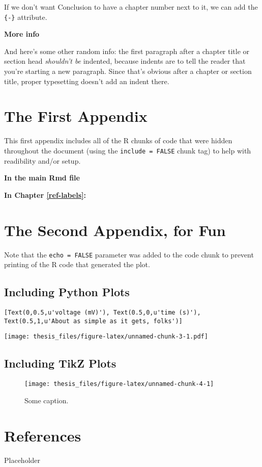 \documentclass[12pt,twoside]{reedthesis}
\begin{document}
If we don't want Conclusion to have a chapter number next to it, we can add the \texttt{\{-\}} attribute.

\textbf{More info}

And here's some other random info: the first paragraph after a chapter title or section head \emph{shouldn't be} indented, because indents are to tell the reader that you're starting a new paragraph. Since that's obvious after a chapter or section title, proper typesetting doesn't add an indent there.

\appendix

\hypertarget{the-first-appendix}{%
\chapter{The First Appendix}\label{the-first-appendix}}

This first appendix includes all of the R chunks of code that were hidden throughout the document (using the \texttt{include\ =\ FALSE} chunk tag) to help with readibility and/or setup.

\textbf{In the main Rmd file}

\textbf{In Chapter \ref{ref-labels}:}

\hypertarget{the-second-appendix-for-fun}{%
\chapter{The Second Appendix, for Fun}\label{the-second-appendix-for-fun}}

Note that the \texttt{echo\ =\ FALSE} parameter was added to the code chunk to prevent printing of the R code that generated the plot.

\hypertarget{including-python-plots}{%
\section{Including Python Plots}\label{including-python-plots}}
\begin{verbatim}
[Text(0,0.5,u'voltage (mV)'), Text(0.5,0,u'time (s)'), Text(0.5,1,u'About as simple as it gets, folks')]
\end{verbatim}
\texttt{[image: thesis\_files/figure-latex/unnamed-chunk-3-1.pdf]}

\hypertarget{including-tikz-plots}{%
\section{Including TikZ Plots}\label{including-tikz-plots}}
\begin{figure}
\texttt{[image: thesis\_files/figure-latex/unnamed-chunk-4-1]} \caption{Some caption.}\label{fig:unnamed-chunk-4}
\end{figure}
\hypertarget{references}{%
\chapter*{References}\label{references}}

Placeholder


\end{document}
